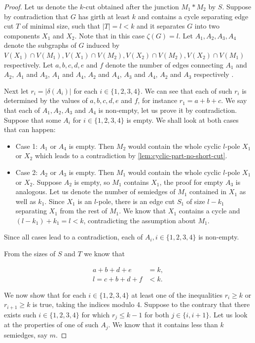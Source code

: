 \documentclass[12pt, twoside]{book}
\begin{document}
\begin{proof}
	Let us denote the $k$-cut obtained after the junction $M_1*M_2$ by $S$. Suppose by contradiction that $G$ has girth at least $k$ and contains a cycle separating edge cut $T$ of minimal size, such that $|T|=l<k$ and it separates $G$ into two components $X_1$ and $X_2$. Note that in this case $\zeta(G)=l$. Let $A_1,A_2,A_3,A_4$ denote the subgraphs of $G$ induced by $V(X_1)\cap V(M_1), V(X_1)\cap V(M_2), V(X_2)\cap V(M_2), V(X_2)\cap V(M_1)$ respectively. Let $a,b,c,d,e$ and $f$ denote the number of edges connecting $A_1$ and $A_2$, $A_1$ and $A_3$, $A_1$ and $A_4$, $A_2$ and $A_4$, $A_3$ and $A_4$, $A_2$ and $A_3$ respectively .
	
	Next let $r_i=|\delta(A_i)|$ for each $i\in\{1,2,3,4\}$. We can see that each of such $r_i$ is determined by the values of $a,b,c,d,e$ and $f$, for instance $r_1=a+b+c$. We say that each of $A_1, A_2,A_3$ and $A_4$ is non-empty, let us prove it by contradiction. Suppose that some $A_i$ for $i\in\{1,2,3,4\}$ is empty. We shall look at both cases that can happen:
	
	\begin{itemize}
		\item Case 1: $A_1$ or $A_4$ is empty. Then $M_2$ would contain the whole cyclic $l$-pole $X_1$ or $X_2$ which leads to a contradiction by \cref{lem:cyclic-part-no-short-cut}.
		\item Case 2: $A_2$ or $A_3$ is empty. Then $M_1$ would contain the whole cyclic $l$-pole $X_1$ or $X_2$. Suppose $A_2$ is empty, so $M_1$ contains $X_1$, the proof for empty $A_3$ is analogous. Let us denote the number of semiedges of $M_1$ contained in $X_1$ as well as $k_1$. Since $X_1$ is an $l$-pole, there is an edge cut $S_1$ of size $l-k_1$ separating $X_1$ from the rest of $M_1$. We know that $X_1$ contains a cycle and $(l-k_1)+k_1=l<k$, contradicting the assumption about $M_1$.
	\end{itemize}
	
	Since all cases lead to a contradiction, each of $A_i, i\in\{1,2,3,4\}$ is non-empty.
	
	From the sizes of $S$ and $T$ we know that
	
	\begin{align}
		a+b+d+e &= k, \label{abde_eq_k}\\
		l=c+b+d+f &< k. \label{cbdf_smaller_k}
	\end{align}
	
	We now show that for each $i\in\{1,2,3,4\}$ at least one of the inequalities $r_i\geq k$ or $r_{i+1}\geq k$ is true, taking the indices modulo 4. Suppose to the contrary that there exists such $i\in\{1,2,3,4\}$ for which $r_j\leq k-1$ for both $j\in\{i, i+1\}$. Let us look at the properties of one of such $A_j$. We know that it contains less than $k$ semiedges, say $m$.
	

\end{proof}
\end{document}
